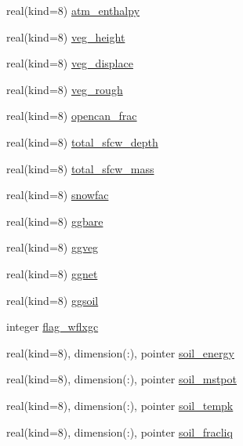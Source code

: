 \begin{DoxyCompactItemize}
\item 
real(kind=8) \hyperlink{structrk4__coms_1_1rk4patchtype_a79ae2ab2774fdd900ec72046deff600b}{atm\+\_\+enthalpy}
\item 
real(kind=8) \hyperlink{structrk4__coms_1_1rk4patchtype_a01bf937d0137c7d8b888de386880e38a}{veg\+\_\+height}
\item 
real(kind=8) \hyperlink{structrk4__coms_1_1rk4patchtype_a889beb0ea44d0ed84e98d6865615e65f}{veg\+\_\+displace}
\item 
real(kind=8) \hyperlink{structrk4__coms_1_1rk4patchtype_aece3a3b1e478a912b45ecf0f983a55af}{veg\+\_\+rough}
\item 
real(kind=8) \hyperlink{structrk4__coms_1_1rk4patchtype_a362cb04cdc4cab21706b0987c22b6fce}{opencan\+\_\+frac}
\item 
real(kind=8) \hyperlink{structrk4__coms_1_1rk4patchtype_a83c6c4f108f8f222d17ef271d8bdbdd8}{total\+\_\+sfcw\+\_\+depth}
\item 
real(kind=8) \hyperlink{structrk4__coms_1_1rk4patchtype_ac1d59ef3d393cc281ca923b9bcaa5743}{total\+\_\+sfcw\+\_\+mass}
\item 
real(kind=8) \hyperlink{structrk4__coms_1_1rk4patchtype_ac3f1af6e189e62ddf1c37b0e442a26b2}{snowfac}
\item 
real(kind=8) \hyperlink{structrk4__coms_1_1rk4patchtype_a9a81315e9e44321708873e7939a530ae}{ggbare}
\item 
real(kind=8) \hyperlink{structrk4__coms_1_1rk4patchtype_a9f3ffeb0b8738497f3a9f93f0d0da759}{ggveg}
\item 
real(kind=8) \hyperlink{structrk4__coms_1_1rk4patchtype_a5fdfba5f5c3669a0560a8fb63709236b}{ggnet}
\item 
real(kind=8) \hyperlink{structrk4__coms_1_1rk4patchtype_a88054f6513194f2af58c5112fe7a6a56}{ggsoil}
\item 
integer \hyperlink{structrk4__coms_1_1rk4patchtype_ab08b5f5880f332383b485763925a2a33}{flag\+\_\+wflxgc}
\item 
real(kind=8), dimension(\+:), pointer \hyperlink{structrk4__coms_1_1rk4patchtype_a11f7c5b4c057f9113ef1ca4ddd9ba5ac}{soil\+\_\+energy}
\item 
real(kind=8), dimension(\+:), pointer \hyperlink{structrk4__coms_1_1rk4patchtype_a611531114ed9949f7684551687b4d991}{soil\+\_\+mstpot}
\item 
real(kind=8), dimension(\+:), pointer \hyperlink{structrk4__coms_1_1rk4patchtype_af643afd1384100e350b98cb17d1dc238}{soil\+\_\+tempk}
\item 
real(kind=8), dimension(\+:), pointer \hyperlink{structrk4__coms_1_1rk4patchtype_ad27dca9eac5f0ad00fe0ee3bece47e90}{soil\+\_\+fracliq}

\end{DoxyCompactItemize}
